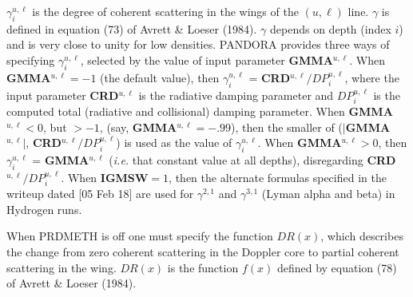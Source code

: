 \blankline
$\gamma_i^{u, \ell}$ is the degree of coherent scattering in the wings
of the $(u,\ell)$ line. $\gamma$ is defined in equation (73) of
Avrett \& Loeser (1984).  $\gamma$ depends on depth (index $i$) and is very
close to unity for low densities. PANDORA provides three ways of specifying
$\gamma_i^{u, \ell}$, selected by the value of input parameter
{\bf GMMA}$^{u, \ell}$.
\blankline
When {\bf GMMA}$^{u, \ell} = -1$
(the default value), then $\gamma_i^{u, \ell}$ = 
{\bf CRD}$^{u, \ell} / DP_i^{u, \ell}$, where the input parameter
{\bf CRD}$^{u, \ell}$ is the radiative damping parameter and \break
$DP_i^{u, \ell}$ is the computed total (radiative and collisional) damping
parameter. 
\blankline
When {\bf GMMA}$^{u, \ell} < 0$, but $> -1$, (say,
{\bf GMMA}$^{u, \ell} = -.99$), then the smaller of
($|${\bf GMMA}$^{u, \ell}|$, {\bf CRD}$^{u, \ell} / DP_i^{u, \ell}$)
is used as the value of $\gamma_i^{u, \ell}$.
\blankline
When {\bf GMMA}$^{u, \ell} > 0$, then 
$\gamma_i^{u, \ell}$ = {\bf GMMA}$^{u, \ell}$ ({\it i.e.} that constant
value at all depths), disregarding {\bf CRD}$^{u, \ell} / DP_i^{u, \ell}$.
\blankline
When {\bf IGMSW}$ = 1$, then the alternate formulas specified in the writeup
dated [05 Feb 18] are used for $\gamma^{2,1}$ and $\gamma^{3,1}$
(Lyman alpha and beta) in Hydrogen runs.
\blankline
\blankline
\centerline{}
\blankline
When PRDMETH is off one must specify the function $DR(x)$, which describes
the change from zero coherent scattering in the Doppler core to
partial coherent scattering in the wing. $DR(x)$ is the
function $f(x)$ defined by equation (78) of Avrett \& Loeser (1984).

